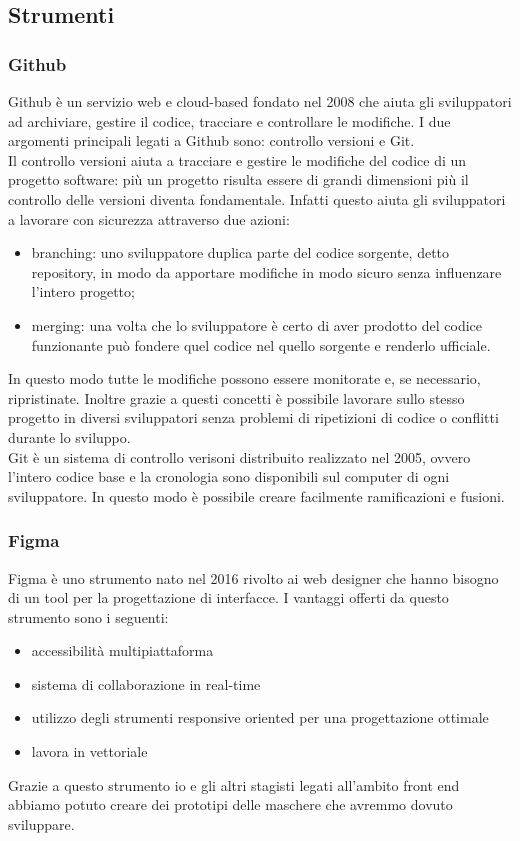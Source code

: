 \subsection{Strumenti}

\subsubsection{Github}

Github è un servizio web e cloud-based fondato nel 2008 che aiuta gli sviluppatori ad archiviare, gestire il codice, tracciare e controllare le modifiche. I due argomenti principali legati a Github sono: controllo versioni e Git.\\
Il controllo versioni aiuta a tracciare e gestire le modifiche del codice di un progetto software: più un progetto risulta essere di grandi dimensioni più il controllo delle versioni diventa fondamentale. Infatti questo aiuta gli sviluppatori a lavorare con sicurezza attraverso due azioni:
\begin{itemize}
	\item branching: uno sviluppatore duplica parte del codice sorgente, detto repository, in modo da apportare modifiche in modo sicuro senza influenzare l'intero progetto;
	\item merging: una volta che lo sviluppatore è certo di aver prodotto del codice funzionante può fondere quel codice nel quello sorgente e renderlo ufficiale.
\end{itemize}
In questo modo tutte le modifiche possono essere monitorate e, se necessario, ripristinate. Inoltre grazie a questi concetti è possibile lavorare sullo stesso progetto in diversi sviluppatori senza problemi di ripetizioni di codice o conflitti durante lo sviluppo.\\
Git è un sistema di controllo verisoni distribuito realizzato nel 2005, ovvero l'intero codice base e la cronologia sono disponibili sul computer di ogni sviluppatore. In questo modo è possibile creare facilmente ramificazioni e fusioni.

\subsubsection{Figma}

Figma è uno strumento nato nel 2016 rivolto ai web designer che hanno bisogno di un tool per la progettazione di interfacce. I vantaggi offerti da questo strumento sono i seguenti:
\begin{itemize}
	\item accessibilità multipiattaforma
	\item sistema di collaborazione in real-time
	\item utilizzo degli strumenti responsive oriented per una progettazione ottimale
	\item lavora in vettoriale
\end{itemize}
Grazie a questo strumento io e gli altri stagisti legati all'ambito front end abbiamo potuto creare dei prototipi delle maschere che avremmo dovuto sviluppare.


